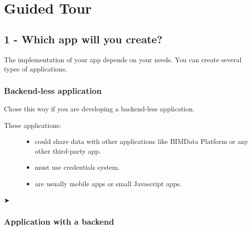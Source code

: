 \documentclass[a4paper,12pt,english]{sphinxmanual}
\begin{document}
\section{Guided Tour}
\label{\detokenize{tutorials/guided_tour:guided-tour}}\label{\detokenize{tutorials/guided_tour::doc}}

\subsection{1 - Which app will you create?}
\label{\detokenize{tutorials/guided_tour:which-app-will-you-create}}
The implementation of your app depends on your needs.
You can create several types of applications.


\subsubsection{Backend-less application}
\label{\detokenize{tutorials/guided_tour:backend-less-application}}
Chose this way if you are developing a backend-less application.
\begin{description}
\item[{These applications:}] \leavevmode\begin{itemize}
\item {} 
could share data with other applications like BIMData Platform or any other third-party app.

\item {} 
must use  credentials system.

\item {} 
are usually mobile apps or small Javascript apps.

\end{itemize}

\end{description}

➤ 


\subsubsection{Application with a backend}
\label{\detokenize{tutorials/guided_tour:application-with-a-backend}}
\end{document}
